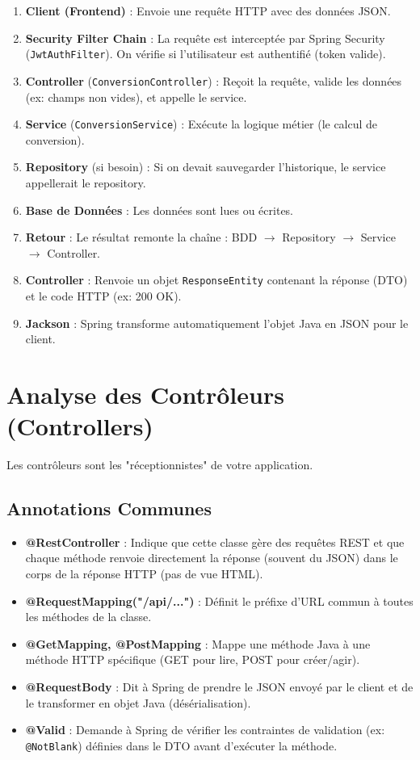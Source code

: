 \documentclass{article}
\begin{document}
\begin{enumerate}
    \item \textbf{Client (Frontend)} : Envoie une requête HTTP avec des données JSON.
    \item \textbf{Security Filter Chain} : La requête est interceptée par Spring Security (\texttt{JwtAuthFilter}). On vérifie si l'utilisateur est authentifié (token valide).
    \item \textbf{Controller} (\texttt{ConversionController}) : Reçoit la requête, valide les données (ex: champs non vides), et appelle le service.
    \item \textbf{Service} (\texttt{ConversionService}) : Exécute la logique métier (le calcul de conversion).
    \item \textbf{Repository} (si besoin) : Si on devait sauvegarder l'historique, le service appellerait le repository.
    \item \textbf{Base de Données} : Les données sont lues ou écrites.
    \item \textbf{Retour} : Le résultat remonte la chaîne : BDD $\rightarrow$ Repository $\rightarrow$ Service $\rightarrow$ Controller.
    \item \textbf{Controller} : Renvoie un objet \texttt{ResponseEntity} contenant la réponse (DTO) et le code HTTP (ex: 200 OK).
    \item \textbf{Jackson} : Spring transforme automatiquement l'objet Java en JSON pour le client.
\end{enumerate}

\section{Analyse des Contrôleurs (Controllers)}

Les contrôleurs sont les "réceptionnistes" de votre application.

\subsection{Annotations Communes}
\begin{itemize}
    \item \textbf{@RestController} : Indique que cette classe gère des requêtes REST et que chaque méthode renvoie directement la réponse (souvent du JSON) dans le corps de la réponse HTTP (pas de vue HTML).
    \item \textbf{@RequestMapping("/api/...")} : Définit le préfixe d'URL commun à toutes les méthodes de la classe.
    \item \textbf{@GetMapping, @PostMapping} : Mappe une méthode Java à une méthode HTTP spécifique (GET pour lire, POST pour créer/agir).
    \item \textbf{@RequestBody} : Dit à Spring de prendre le JSON envoyé par le client et de le transformer en objet Java (désérialisation).
    \item \textbf{@Valid} : Demande à Spring de vérifier les contraintes de validation (ex: \texttt{@NotBlank}) définies dans le DTO avant d'exécuter la méthode.
\end{itemize}
\end{document}
